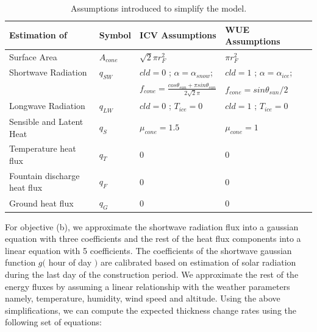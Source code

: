 \documentclass[tc, manuscript]{copernicus}
\begin{document}
\begin{table}[]
\centering
\caption{Assumptions introduced to simplify the model.}
\label{tab:assumptions}
\begin{tabular}{@{}lllll@{}}
\toprule
\textbf{Estimation of} & \textbf{Symbol} & \textbf{ICV Assumptions} & \textbf{WUE Assumptions} & \\ \midrule
\multicolumn{1}{|l}{Surface Area}        & $A_{cone}$ & $ \sqrt{2} \pi r_{F}^2$ & $\pi r_{F}^2$ & \multicolumn{1}{l|}{} \\ \midrule
\multicolumn{1}{|l}{Shortwave Radiation} & $q_{SW}$ & $cld = 0$ ; $\alpha=\alpha_{snow}$; & $cld = 1$ ;
$\alpha=\alpha_{ice}$; & \multicolumn{1}{l|}{} \\ 
\multicolumn{1}{|l}{ } &  & $f_{cone} = \frac{cos \theta_{sun} + \pi sin \theta_{sun}}{2\sqrt{2}\pi}$  & $f_{cone} = sin \theta_{sun} / 2$ & \multicolumn{1}{l|}{} \\ \midrule
\multicolumn{1}{|l}{Longwave Radiation}  & $q_{LW}$ & $cld = 0$ ; $T_{ice} = 0$ & $cld = 1$ ; $T_{ice} = 0$ & \multicolumn{1}{l|}{} \\ \midrule
\multicolumn{1}{|l}{Sensible and Latent Heat}       & $q_{S}$ &$\mu_{cone} = 1.5$  & $\mu_{cone} = 1$ & \multicolumn{1}{l|}{} \\ \midrule
\multicolumn{1}{|l}{Temperature heat flux} & $q_{T}$ & 0 & 0 & \multicolumn{1}{l|}{} \\ \midrule
\multicolumn{1}{|l}{Fountain discharge heat flux} & $q_{F}$ & 0 & 0 & \multicolumn{1}{l|}{} \\ \midrule
\multicolumn{1}{|l}{Ground heat flux}    & $q_{G}$ & 0 & 0 & \multicolumn{1}{l|}{} \\ \bottomrule
\end{tabular}
\end{table}

For objective (b), we approximate the shortwave radiation flux into a gaussian equation with three coefficients
and the rest of the heat flux components into a linear equation with 5 coefficients. The coefficients of the
shortwave gaussian function $g($ hour of day $)$ are calibrated based on estimation of solar radiation during
the last day of the construction period. We approximate the rest of the energy fluxes by assuming a linear
relationship with the weather parameters namely, temperature, humidity, wind speed and altitude. Using the above
simplifications, we can compute the expected thickness change rates using the following set of equations:
\end{document}
